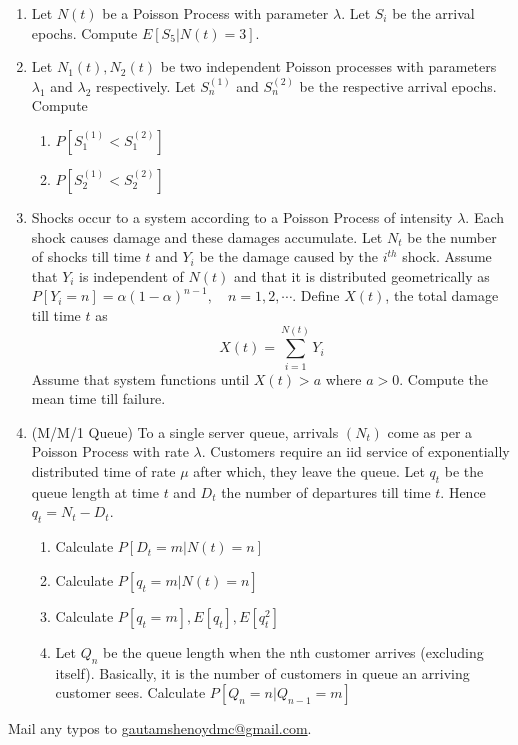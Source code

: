 \documentclass[a4paper,10pt]{article}
\begin{document}
\begin{enumerate}
\item Let $N(t)$ be a Poisson Process with parameter $\lambda$. Let $S_i$ be the arrival epochs. Compute $E[S_5|N(t)=3]$.

\item Let $N_1(t), N_2(t)$ be two independent Poisson processes with parameters $\lambda_1$ and $\lambda_2$ respectively. Let $S_n^{(1)}$ and $S_n^{(2)}$ be the respective arrival epochs. Compute
\begin{enumerate}
	\item $P[S_1^{(1)} < S_1^{(2)}]$
	\item $P[S_2^{(1)} < S_2^{(2)}]$
\end{enumerate}

\item Shocks occur to a system according to a Poisson Process of intensity $\lambda$. Each shock causes damage and these damages accumulate. Let $N_t$ be the number of shocks till time $t$ and $Y_i$ be the damage caused by the $i^{th}$ shock. Assume that $Y_i$ is independent of $N(t)$ and that it is distributed geometrically as $P[Y_i = n] = \alpha(1-\alpha)^{n-1}, \quad n=1,2,\cdots$. Define $X(t)$, the total damage till time $t$ as
\[X(t) = \sum_{i=1}^{N(t)} Y_i\]
Assume that system functions until $X(t) > a$ where $a>0$. Compute the mean time till failure. 
\item (M/M/1 Queue) To a single server queue, arrivals $(N_t)$ come as per a Poisson Process with rate $\lambda$. Customers require an iid service of exponentially distributed time of rate $\mu$ after which, they leave the queue. Let $q_t$ be the queue length at time $t$ and $D_t$ the number of departures till time $t$. Hence $q_t=N_t - D_t$.
\begin{enumerate}
	\item Calculate $P[D_t=m|N(t)=n]$
	\item Calculate $P[q_t=m|N(t)=n]$
	\item Calculate $P[q_t=m], E[q_t], E[q_t^2]$
	\item Let $Q_n$ be the queue length when the nth customer arrives (excluding itself). Basically, it is the number of customers in queue an arriving customer sees. Calculate $P[Q_n = n| Q_{n-1} = m]$
\end{enumerate}
\end{enumerate}

Mail any typos to \url{gautamshenoydmc@gmail.com}.
\end{document}
